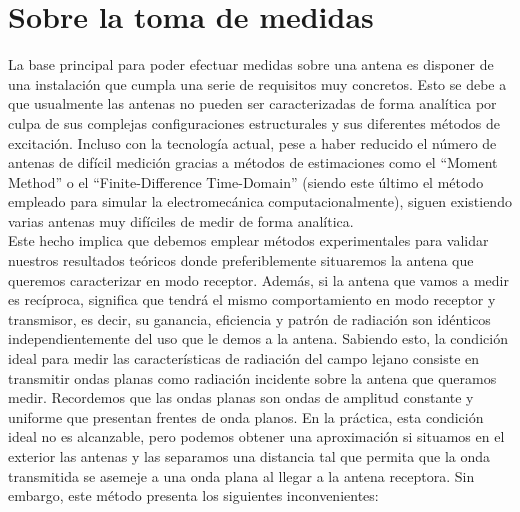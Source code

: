 \section{Sobre la toma de medidas}

La base principal para poder efectuar medidas sobre una antena es disponer de una instalación que cumpla una serie de requisitos muy concretos. Esto se debe a que usualmente las antenas no pueden ser caracterizadas de forma analítica por culpa de sus complejas configuraciones estructurales y sus diferentes métodos de excitación. Incluso con la tecnología actual, pese a haber reducido el número de antenas de difícil medición gracias a métodos de estimaciones como el “Moment Method” o el “Finite-Difference Time-Domain” (siendo este último el método empleado para simular la electromecánica computacionalmente), siguen existiendo varias antenas muy difíciles de medir de forma analítica.\\ 

Este hecho implica que debemos emplear métodos experimentales para validar nuestros resultados teóricos donde preferiblemente situaremos la antena que queremos caracterizar en modo receptor. Además, si la antena que vamos a medir es recíproca, significa que tendrá el mismo comportamiento en modo receptor y transmisor, es decir, su ganancia, eficiencia y patrón de radiación son idénticos independientemente del uso que le demos a la antena. Sabiendo esto, la condición ideal para medir las características de radiación del campo lejano consiste en transmitir ondas planas como radiación incidente sobre la antena que queramos medir. Recordemos que las ondas planas son ondas de amplitud constante y uniforme que presentan frentes de onda planos. En la práctica, esta condición ideal no es alcanzable, pero podemos obtener una aproximación si situamos en el exterior las antenas y las separamos una distancia tal que permita que la onda transmitida se asemeje a una onda plana al llegar a la antena receptora. Sin embargo, este método presenta los siguientes inconvenientes:

